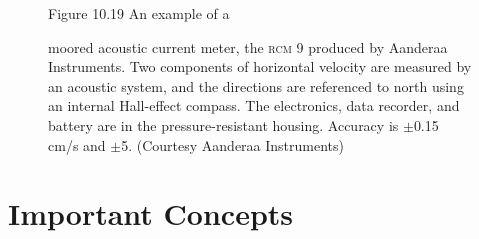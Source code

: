 \begin{figure}[t!]
\footnotesize
Figure 10.19 An example of a \rule{0mm}{5ex}moored acoustic current meter, the \textsc{rcm 9}
produced by Aanderaa Instruments. Two components of horizontal velocity are
measured by an acoustic system, and the directions are referenced to north
using an internal Hall-effect compass. The electronics, data recorder, and battery
are in the pressure-resistant housing. Accuracy is $\pm$0.15
cm/s and
$\pm$5\degrees. (Courtesy Aanderaa Instruments)
\label{fig:RCM9}
\vspace{-2ex}
\end{figure}

\section{Important Concepts}
